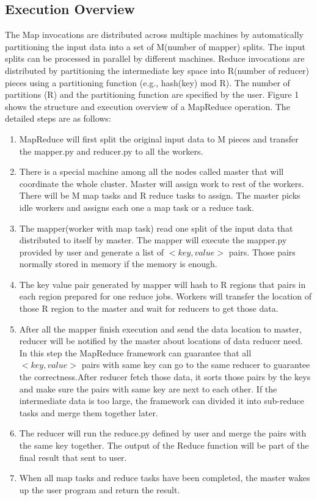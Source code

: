 \documentclass{article}
\begin{document}
\subsection{Execution Overview \cite{dean2008mapreduce}}
The Map invocations are distributed across multiple
machines by automatically partitioning the input data
into a set of M(number of mapper) splits. The input splits can be processed in parallel by different machines. Reduce invocations are distributed by partitioning the intermediate key
space into R(number of reducer) pieces using a partitioning function (e.g.,
hash(key) mod R). The number of partitions (R) and
the partitioning function are specified by the user.
Figure 1 shows the structure and execution overview of a MapReduce operation. The detailed steps are as follows:

\begin{enumerate}
      \item MapReduce will first split the original input data to M pieces and transfer 
      the mapper.py and reducer.py to all the workers.
      \item There is a special machine among all the nodes called master that will coordinate the whole cluster.
       Master will assign work to rest of the workers. There will be M map tasks and R reduce
      tasks to assign. The master picks idle workers and
      assigns each one a map task or a reduce task.
      \item The mapper(worker with map task) read one split of the input data 
      that distributed to itself by master. The mapper will execute the mapper.py provided by 
      user and generate a list of $<key, value>$ pairs. Those pairs normally stored in memory if the memory is enough.
      \item The key value pair generated by mapper will hash to R regions that pairs in each region prepared for one reduce jobs.
      Workers will transfer the location of those R region to the master and wait for reducers to get those data. 
      \item After all the mapper finish execution and send the data location to master,
      reducer will be notified by the master about locations of data reducer need. In this step the MapReduce framework
      can guarantee that all  $<key, value>$ pairs with same key can go to the same reducer to guarantee the correctness.After reducer
      fetch those data, it sorts those pairs by the keys and make sure the pairs with same key are next to each other. If the intermediate data is too large,
      the framework can divided it into sub-reduce tasks and merge them together later.
      \item The reducer will run the reduce.py defined by user and merge the pairs with the same key together.
      The output of the Reduce function will be part of the final result that sent to user.
      \item When all map tasks and reduce tasks have been
      completed, the master wakes up the user program and return the result.
\end{enumerate}
\end{document}
